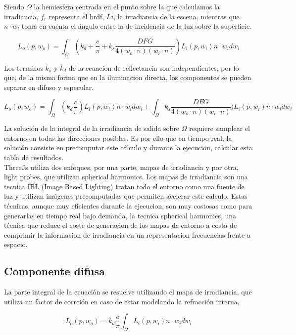 Siendo $\Omega$ la hemiesfera centrada en el punto sobre la que calculamos la irradiancia,
$f_r$ representa el brdf, $Li$, la irradiancia de la escena, mientras que $n\cdot{w_i}$ toma en
cuenta el \'angulo entre la de incidencia de la luz sobre la superficie.

\begin{equation}
L_o(p, w_o) = \int_{\Omega} (k_d + \frac{c}{\pi} + 
k_s \frac{DFG}{4(w_o\cdot{n})(w_i\cdot{n})})L_i(p, w_i)n\cdot{w_i}dw_i
\end{equation}

Los terminos $k_s$ y $k_d$ de la ecuacion de reflectancia son independientes, por lo que, de la
misma forma que en la iluminacion directa, los componentes se pueden separar en difuso y
especular.

\begin{equation}
L_o(p, w_o) = \int_{\Omega}
(k_d \frac{c}{\pi}) L_i(p, w_i)n\cdot{w_i}dw_i +
\int_{\Omega} 
k_s \frac{DFG}{4(w_o\cdot{n})(w_i\cdot{n})})L_i(p, w_i)n\cdot{w_i}dw_i
\end{equation}

La soluci\'on de la integral de la irradiancia de salida sobre $\Omega$ requiere samplear el entorno
en todas las direcciones posibles. Es por ello que en tiempo real, la soluci\'on consiste en
precomputar este c\'alculo y durante la ejecucion, calcular esta tabla de resultados.\\
ThreeJs utiliza dos enfoques, por una parte, mapas de irradiancia y por otra, light probes, que
utilizan spherical harmonics. Los mapas de irradiancia son una tecnica IBL (Image Based Lighting)
tratan todo el entorno como una fuente de luz y utilizan im\'agenes precomputadas que permiten
acelerar este calculo. Estas t\'ecnicas, aunque muy eficientes durante la ejecucion, son muy
costosas como para generarlas en tiempo real bajo demanda, la tecnica spherical harmonics, una
t\'ecnica que reduce el coste de generacion de los mapas de entorno a costa de comprimir la
informacion de irradiancia en un representacion frecuencias frente a espacio.

  \subsection{Componente difusa}
    La parte integral de la ecuaci\'on se resuelve utilizando el mapa de irradiancia,
    que utiliza un factor de corrci\'on en caso de estar modelando la refracci\'on interna,

    $$
    L_o(p, w_o) = k_d \frac{c}{\pi} \int_{\Omega}{L_i(p, w_i) n\cdot{w_i}dw_i}{}
    $$

